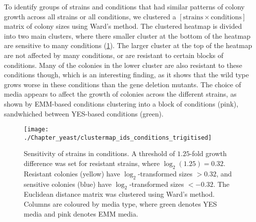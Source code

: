 To identify groups of strains and conditions that had similar patterns of colony growth across all strains or all conditions, we clustered a $[\text{strains} \times \text{conditions}]$ matrix of colony sizes using Ward's method.
The clustered heatmap is divided into two main clusters, where there smaller cluster at the bottom of the heatmap are sensitive to many conditions (\ref{fig:clustermap-ids-conditions}).
The larger cluster at the top of the heatmap are not affected by many conditions, or are resistant to certain blocks of conditions.
Many of the colonies in the lower cluster are also resistant to these conditions though, which is an interesting finding, as it shows that the wild type grows worse in these conditions than the gene deletion mutants.
The choice of media appears to affect the growth of colonies across the different strains, as shown by EMM-based conditions clustering into a block of conditions (pink), sandwhiched between YES-based conditions (green).



\begin{figure}[!hbtp]
    \centering
    \texttt{[image: ./Chapter\_yeast/clustermap\_ids\_conditions\_trigitised]}
    \caption{%
        Sensitivity of strains in conditions.
        A threshold of $1.25$-fold growth difference was set for resistant strains, where $\log_2(1.25) = 0.32$.
        Resistant colonies (yellow) have $\log_2$-transformed sizes $> 0.32$, and sensitive colonies (blue) have $\log_2$-transformed sizes $< -0.32$.
        The Euclidean distance matrix was clustered using Ward's method.
        Columns are coloured by media type, where green denotes YES media and pink denotes EMM media.
    }
    \label{fig:clustermap-ids-conditions}
\end{figure}

